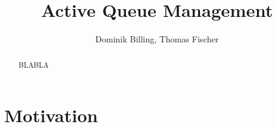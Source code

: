 \documentclass[10pt,article]{IEEEtran}
\title{Active Queue Management}
\author{Dominik Billing, Thomas Fischer}
\begin{document}
\maketitle

\begin{abstract}
BLABLA
\end{abstract}

\section{Motivation}


\end{document}
